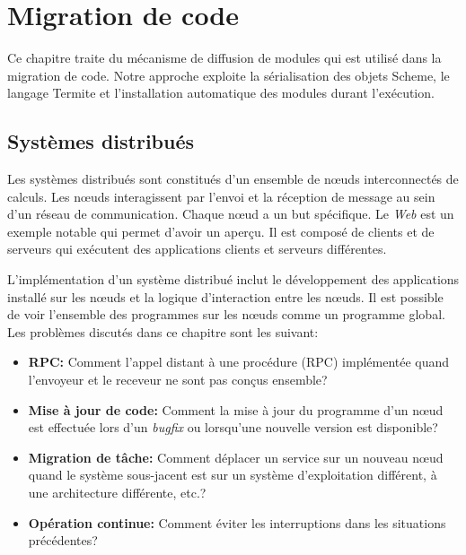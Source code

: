 \chapter{Migration de code}
\label{ch:task_migration}

Ce chapitre traite du mécanisme de diffusion de modules qui est utilisé dans
la migration de code. Notre approche exploite la sérialisation des objets
Scheme, le langage Termite et l'installation automatique des modules durant
l'exécution.

\section{Systèmes distribués}

Les systèmes distribués sont constitués d'un ensemble de nœuds interconnectés
de calculs. Les nœuds interagissent par l'envoi et la réception de message
au sein d'un réseau de communication. Chaque nœud a un but spécifique. Le
\textit{Web} est un exemple notable qui permet d'avoir un aperçu.
Il est composé de clients et de serveurs qui exécutent
des applications clients et serveurs différentes.

L'implémentation d'un système distribué inclut le développement des applications
installé sur les nœuds et la logique d'interaction entre les nœuds. Il est
possible de voir l'ensemble des programmes sur les nœuds comme un programme
global. Les problèmes discutés dans ce chapitre sont les suivant:

\begin{itemize}

  \item {\bf RPC:} Comment l'appel distant à une procédure (RPC)
    implémentée quand l'envoyeur et le receveur ne sont pas conçus
    ensemble?

  \item {\bf Mise à jour de code:} Comment la mise à jour du programme d'un
    nœud est effectuée lors d'un \textit{bugfix} ou lorsqu'une nouvelle
    version est disponible?

  \item {\bf Migration de tâche:} Comment déplacer un service sur un nouveau
    nœud quand le système sous-jacent est sur un système d'exploitation
    différent, à une architecture différente, etc.?

  \item {\bf Opération continue:} Comment éviter les interruptions dans les
    situations précédentes?

\end{itemize}

